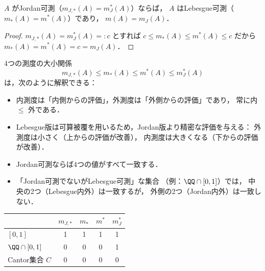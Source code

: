 \begin{corollary}\label{cor:jordan-implies-lebesgue}
$A$ がJordan可測（$m_{J,*}(A) = m_J^*(A)$）ならば，
$A$ はLebesgue可測（$m_*(A) = m^*(A)$）であり，
$m(A) = m_J(A)$．
\end{corollary}
\begin{proof}
$m_{J,*}(A) = m_J^*(A) =: c$ とすれば
$c \le m_*(A) \le m^*(A) \le c$
だから $m_*(A) = m^*(A) = c = m_J(A)$．
\end{proof}

\begin{remark}[解釈]
4つの測度の大小関係
\[
m_{J,*}(A) \le m_*(A) \le m^*(A) \le m_J^*(A)
\]
は，次のように解釈できる：
\begin{itemize}
\item 内測度は「内側からの評価」，外測度は「外側からの評価」であり，
常に内 $\le$ 外である．
\item Lebesgue版は可算被覆を用いるため，Jordan版より精密な評価を与える：
外測度は小さく（上からの評価が改善），
内測度は大きくなる（下からの評価が改善）．
\item Jordan可測ならば4つの値がすべて一致する．
\item 「Jordan可測でないがLebesgue可測」な集合
（例：$\QQ \cap [0,1]$）では，
中央の2つ（Lebesgue内外）は一致するが，
外側の2つ（Jordan内外）は一致しない．
\end{itemize}

\begin{center}
\begin{tabular}{l|cccc}
& $m_{J,*}$ & $m_*$ & $m^*$ & $m_J^*$ \\ \hline
$[0,1]$            & 1 & 1 & 1 & 1 \\
$\QQ \cap [0,1]$   & 0 & 0 & 0 & 1 \\
Cantor集合 $C$      & 0 & 0 & 0 & 0
\end{tabular}
\end{center}
\end{remark}
